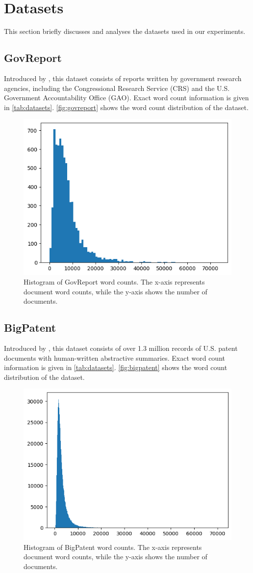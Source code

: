 \section{Datasets}
\label{sec:datasets}

This section briefly discusses and analyses the datasets used in our experiments.


\subsection*{GovReport}

Introduced by \citet{huang-etal-2021-efficient}, this dataset consists of reports written by government research agencies, including the Congressional Research Service (CRS) and the U.S. Government Accountability Office (GAO).
Exact word count information is given in \autoref{tab:datasets}.
\autoref{fig:govreport} shows the word count distribution of the dataset.

\begin{figure}[!ht]
  \centering
  \includegraphics[width=.48\textwidth]{images/govreport-wordcount.png}
  \caption{
    Histogram of GovReport word counts.
    The x-axis represents document word counts, while the y-axis shows the number of documents.
  }
  \label{fig:govreport}
\end{figure}


\subsection*{BigPatent}

Introduced by \citet{sharma-etal-2019-bigpatent}, this dataset consists of over 1.3 million records of U.S. patent documents with human-written abstractive summaries.
Exact word count information is given in \autoref{tab:datasets}.
\autoref{fig:bigpatent} shows the word count distribution of the dataset.

\begin{figure}[!ht]
  \centering
  \includegraphics[width=.48\textwidth]{images/bigpatent-wordcount.png}
  \caption{
    Histogram of BigPatent word counts.
    The x-axis represents document word counts, while the y-axis shows the number of documents.
  }
  \label{fig:bigpatent}
\end{figure}


